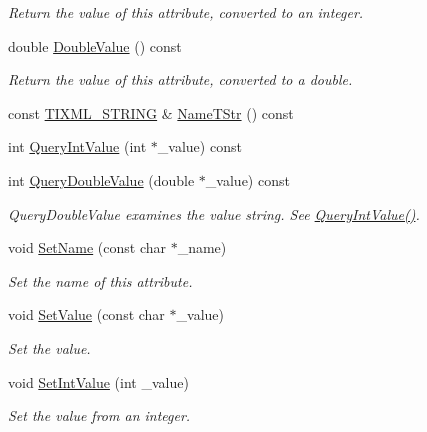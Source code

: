 \begin{DoxyCompactItemize}
\begin{DoxyCompactList}\small\item\em Return the value of this attribute, converted to an integer. \end{DoxyCompactList}\item 
double \hyperlink{class_ti_xml_attribute_a8cca240fb2a7130c87b0fc6156e8b34f}{Double\+Value} () const
\begin{DoxyCompactList}\small\item\em Return the value of this attribute, converted to a double. \end{DoxyCompactList}\item 
const \hyperlink{tinyxml_8h_a92bada05fd84d9a0c9a5bbe53de26887}{T\+I\+X\+M\+L\+\_\+\+S\+T\+R\+I\+NG} \& \hyperlink{class_ti_xml_attribute_a2bd49ec37463a0a2d081e6587f8b89b8}{Name\+T\+Str} () const
\item 
int \hyperlink{class_ti_xml_attribute_a6caa8090d2fbb7966700a16e45ed33de}{Query\+Int\+Value} (int $\ast$\+\_\+value) const
\item 
int \hyperlink{class_ti_xml_attribute_a6fa41b710c1b79de37a97004aa600c06}{Query\+Double\+Value} (double $\ast$\+\_\+value) const
\begin{DoxyCompactList}\small\item\em Query\+Double\+Value examines the value string. See \hyperlink{class_ti_xml_attribute_a6caa8090d2fbb7966700a16e45ed33de}{Query\+Int\+Value()}. \end{DoxyCompactList}\item 
void \hyperlink{class_ti_xml_attribute_ab7fa3d21ff8d7c5764cf9af15b667a99}{Set\+Name} (const char $\ast$\+\_\+name)
\begin{DoxyCompactList}\small\item\em Set the name of this attribute. \end{DoxyCompactList}\item 
void \hyperlink{class_ti_xml_attribute_a2dae44178f668b3cb48101be4f2236a0}{Set\+Value} (const char $\ast$\+\_\+value)
\begin{DoxyCompactList}\small\item\em Set the value. \end{DoxyCompactList}\item 
void \hyperlink{class_ti_xml_attribute_a7e065df640116a62ea4f4b7da5449cc8}{Set\+Int\+Value} (int \+\_\+value)
\begin{DoxyCompactList}\small\item\em Set the value from an integer. \end{DoxyCompactList}\item 

\end{DoxyCompactItemize}
